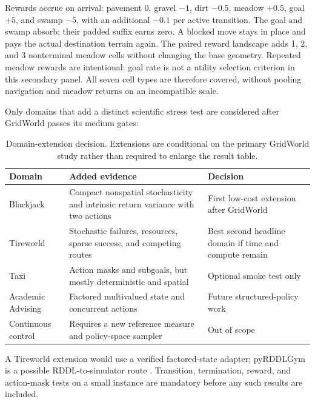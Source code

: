 Rewards accrue on arrival: pavement 0, gravel $-1$, dirt $-0.5$, meadow $+0.5$,
goal $+5$, and swamp $-5$, with an additional $-0.1$ per active transition.
The goal and swamp absorb; their padded suffix earns zero. A blocked move stays
in place and pays the actual destination terrain again. The paired reward
landscape adds 1, 2, and 3 nonterminal meadow cells without changing the base
geometry. Repeated meadow rewards are intentional: goal rate is not a utility
selection criterion in this secondary panel. All seven cell types are therefore
covered, without pooling navigation and meadow returns on an incompatible scale.

Only domains that add a distinct scientific stress test are considered after
GridWorld passes its medium gates:
\begin{table}[t]
  \centering
  \small
  \caption{Domain-extension decision.  Extensions are conditional on the
  primary GridWorld study rather than required to enlarge the result table.}
  \label{tab:domain-scope}
  \begin{tabular}{@{}p{25mm}p{62mm}p{35mm}@{}}
    \toprule
    Domain & Added evidence & Decision \\
    \midrule
    Blackjack & Compact nonspatial stochasticity and intrinsic return
      variance with two actions \citep{towersEtAl2025} & First low-cost
      extension after GridWorld \\
    Tireworld & Stochastic failures, resources, sparse success, and competing
      routes \citep{bonetGeffner2005} & Best second headline domain if time and
      compute remain \\
    Taxi & Action masks and subgoals, but mostly deterministic and spatial &
      Optional smoke test only \\
    Academic Advising & Factored multivalued state and concurrent actions
      \citep{guerinEtAl2012} & Future structured-policy work \\
    Continuous control & Requires a new reference measure and policy-space
      sampler & Out of scope \\
    \bottomrule
  \end{tabular}
\end{table}

A Tireworld extension would use a verified factored-state adapter; pyRDDLGym
is a possible RDDL-to-simulator route \citep{taitlerEtAl2022}.  Transition,
termination, reward, and action-mask tests on a small instance are mandatory
before any such results are included.


